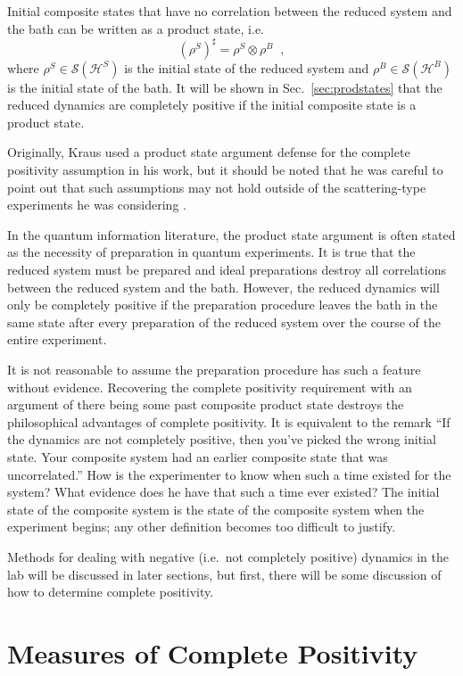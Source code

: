 Initial composite states that have no correlation between the reduced system and the bath can be written as a product state, i.e.\
\begin{equation*}
(\rho^S)^\sharp = \rho^S \otimes \rho^B\;\;,
\end{equation*}
where $\rho^S\in\mathcal{S}(\mathcal{H}^S)$ is the initial state of the reduced system and $\rho^B\in\mathcal{S}(\mathcal{H}^B)$ is the initial state of the bath.  It will be shown in Sec.\ \ref{sec:prodstates} that the reduced dynamics are completely positive if the initial composite state is a product state.  

Originally, Kraus used a product state argument defense for the complete positivity assumption in his work, but it should be noted that he was careful to point out that such assumptions may not hold outside of the scattering-type experiments he was considering \cite{Kraus1983}.  

In the quantum information literature, the product state argument is often stated as the necessity of preparation in quantum experiments.  It is true that the reduced system must be prepared and ideal preparations destroy all correlations between the reduced system and the bath.  However, the reduced dynamics will only be completely positive if the preparation procedure leaves the bath in the same state after every preparation of the reduced system over the course of the entire experiment.  

It is not reasonable to assume the preparation procedure has such a feature without evidence.  Recovering the complete positivity requirement with an argument of there being some past composite product state destroys the philosophical advantages of complete positivity. It is equivalent to the remark ``If the dynamics are not completely positive, then you've picked the wrong initial state. Your composite system had an earlier composite state that was uncorrelated.''  How is the experimenter to know when such a time existed for the system?  What evidence does he have that such a time ever existed?  The initial state of the composite system is the state of the composite system when the experiment begins; any other definition becomes too difficult to justify. 

Methods for dealing with negative (i.e.\ not completely positive) dynamics in the lab will be discussed in later sections, but first, there will be some discussion of how to determine complete positivity.

\chapter{Measures of Complete Positivity}


